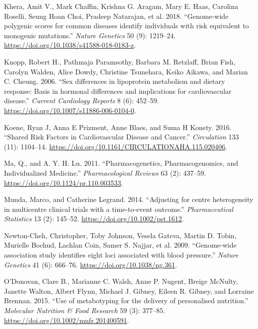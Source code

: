 \documentclass[]{article}
\begin{document}
\leavevmode\hypertarget{ref-Khera2018}{}%
Khera, Amit V., Mark Chaffin, Krishna G. Aragam, Mary E. Haas, Carolina
Roselli, Seung Hoan Choi, Pradeep Natarajan, et al. 2018. ``Genome-wide
polygenic scores for common diseases identify individuals with risk
equivalent to monogenic mutations.'' \emph{Nature Genetics} 50 (9):
1219--24. \url{https://doi.org/10.1038/s41588-018-0183-z}.

\leavevmode\hypertarget{ref-Knopp2006}{}%
Knopp, Robert H., Pathmaja Paramsothy, Barbara M. Retzlaff, Brian Fish,
Carolyn Walden, Alice Dowdy, Christine Tsunehara, Keiko Aikawa, and
Marian C. Cheung. 2006. ``Sex differences in lipoprotein metabolism and
dietary response: Basis in hormonal differences and implications for
cardiovascular disease.'' \emph{Current Cardiology Reports} 8 (6):
452--59. \url{https://doi.org/10.1007/s11886-006-0104-0}.

\leavevmode\hypertarget{ref-Koene2016}{}%
Koene, Ryan J, Anna E Prizment, Anne Blaes, and Suma H Konety. 2016.
``Shared Risk Factors in Cardiovascular Disease and Cancer.''
\emph{Circulation} 133 (11): 1104--14.
\url{https://doi.org/10.1161/CIRCULATIONAHA.115.020406}.

\leavevmode\hypertarget{ref-Ma2011}{}%
Ma, Q., and A. Y. H. Lu. 2011. ``Pharmacogenetics, Pharmacogenomics, and
Individualized Medicine.'' \emph{Pharmacological Reviews} 63 (2):
437--59. \url{https://doi.org/10.1124/pr.110.003533}.

\leavevmode\hypertarget{ref-Munda2014}{}%
Munda, Marco, and Catherine Legrand. 2014. ``Adjusting for centre
heterogeneity in multicentre clinical trials with a time-to-event
outcome.'' \emph{Pharmaceutical Statistics} 13 (2): 145--52.
\url{https://doi.org/10.1002/pst.1612}.

\leavevmode\hypertarget{ref-Newton-Cheh2009}{}%
Newton-Cheh, Christopher, Toby Johnson, Vesela Gateva, Martin D. Tobin,
Murielle Bochud, Lachlan Coin, Samer S. Najjar, et al. 2009.
``Genome-wide association study identifies eight loci associated with
blood pressure.'' \emph{Nature Genetics} 41 (6): 666--76.
\url{https://doi.org/10.1038/ng.361}.

\leavevmode\hypertarget{ref-ODonovan2015}{}%
O'Donovan, Clare B., Marianne C. Walsh, Anne P. Nugent, Breige McNulty,
Janette Walton, Albert Flynn, Michael J. Gibney, Eileen R. Gibney, and
Lorraine Brennan. 2015. ``Use of metabotyping for the delivery of
personalised nutrition.'' \emph{Molecular Nutrition \& Food Research} 59
(3): 377--85. \url{https://doi.org/10.1002/mnfr.201400591}.
\end{document}
